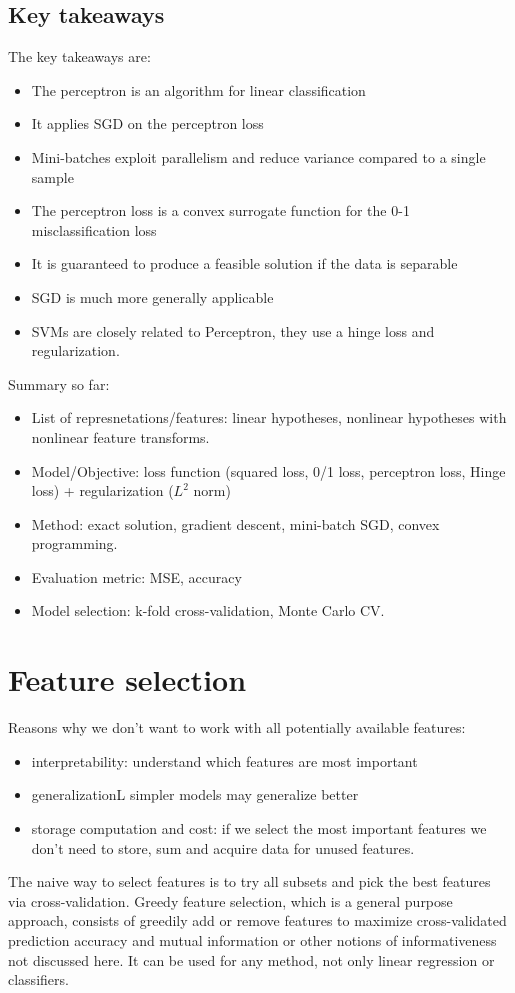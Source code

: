 \documentclass[a4paper,10pt,twoside]{article}
\begin{document}
\subsection{Key takeaways}
The key takeaways are:
\begin{itemize}
    \item The perceptron is an algorithm for linear classification
    \item It applies SGD on the perceptron loss
    \item Mini-batches exploit parallelism and reduce variance compared to a single sample
    \item The perceptron loss is a convex surrogate function for the 0-1 misclassification loss
    \item It is guaranteed to produce a feasible solution if the data is separable
    \item SGD is much more generally applicable
    \item SVMs are closely related to Perceptron, they use a hinge loss and regularization.
\end{itemize}
Summary so far:
\begin{itemize}
    \item List of represnetations/features: linear hypotheses, nonlinear hypotheses with nonlinear feature transforms.
    \item Model/Objective: loss function (squared loss, 0/1 loss, perceptron loss, Hinge loss) + regularization ($L^2$ norm)
    \item Method: exact solution, gradient descent, mini-batch SGD, convex programming.
    \item Evaluation metric: MSE, accuracy
    \item Model selection: k-fold cross-validation, Monte Carlo CV.
\end{itemize}

\section{Feature selection}
Reasons why we don't want to work with all potentially available features:
\begin{itemize}
    \item interpretability: understand which features are most important
    \item generalizationL simpler models may generalize better
    \item storage computation and cost: if we select the most important features we don't need to store, sum and acquire data for unused features.
\end{itemize}
The naive way to select features is to try all subsets and pick the best features via cross-validation. Greedy feature selection, which is a general purpose approach, consists of greedily add or remove features to maximize cross-validated prediction accuracy and mutual information or other notions of informativeness not discussed here. It can be used for any method, not only linear regression or classifiers.
\end{document}
